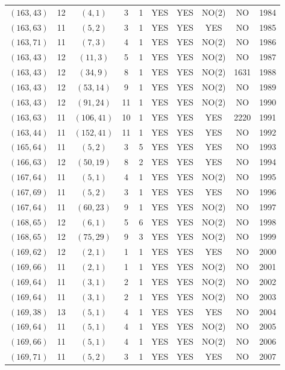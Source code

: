 \begin{longtable}{|c|c|c|c|c|c|c|c|c|c|}
$(163, 43)$ & 12 & $(4, 1)$ & 3 & 1 & YES & YES & NO(2) & NO & 1984\\
$(163, 63)$ & 11 & $(5, 2)$ & 3 & 1 & YES & YES & YES & NO & 1985\\
$(163, 71)$ & 11 & $(7, 3)$ & 4 & 1 & YES & YES & NO(2) & NO & 1986\\
$(163, 43)$ & 12 & $(11, 3)$ & 5 & 1 & YES & YES & NO(2) & NO & 1987\\
$(163, 43)$ & 12 & $(34, 9)$ & 8 & 1 & YES & YES & NO(2) & 1631 & 1988\\
$(163, 43)$ & 12 & $(53, 14)$ & 9 & 1 & YES & YES & NO(2) & NO & 1989\\
$(163, 43)$ & 12 & $(91, 24)$ & 11 & 1 & YES & YES & NO(2) & NO & 1990\\
$(163, 63)$ & 11 & $(106, 41)$ & 10 & 1 & YES & YES & YES & 2220 & 1991\\
$(163, 44)$ & 11 & $(152, 41)$ & 11 & 1 & YES & YES & YES & NO & 1992\\
$(165, 64)$ & 11 & $(5, 2)$ & 3 & 5 & YES & YES & YES & NO & 1993\\
$(166, 63)$ & 12 & $(50, 19)$ & 8 & 2 & YES & YES & YES & NO & 1994\\
$(167, 64)$ & 11 & $(5, 1)$ & 4 & 1 & YES & YES & NO(2) & NO & 1995\\
$(167, 69)$ & 11 & $(5, 2)$ & 3 & 1 & YES & YES & YES & NO & 1996\\
$(167, 64)$ & 11 & $(60, 23)$ & 9 & 1 & YES & YES & NO(2) & NO & 1997\\
$(168, 65)$ & 12 & $(6, 1)$ & 5 & 6 & YES & YES & NO(2) & NO & 1998\\
$(168, 65)$ & 12 & $(75, 29)$ & 9 & 3 & YES & YES & NO(2) & NO & 1999\\
$(169, 62)$ & 12 & $(2, 1)$ & 1 & 1 & YES & YES & YES & NO & 2000\\
$(169, 66)$ & 11 & $(2, 1)$ & 1 & 1 & YES & YES & NO(2) & NO & 2001\\
$(169, 64)$ & 11 & $(3, 1)$ & 2 & 1 & YES & YES & NO(2) & NO & 2002\\
$(169, 64)$ & 11 & $(3, 1)$ & 2 & 1 & YES & YES & NO(2) & NO & 2003\\
$(169, 38)$ & 13 & $(5, 1)$ & 4 & 1 & YES & YES & YES & NO & 2004\\
$(169, 64)$ & 11 & $(5, 1)$ & 4 & 1 & YES & YES & NO(2) & NO & 2005\\
$(169, 66)$ & 11 & $(5, 1)$ & 4 & 1 & YES & YES & NO(2) & NO & 2006\\
$(169, 71)$ & 11 & $(5, 2)$ & 3 & 1 & YES & YES & YES & NO & 2007\\

\end{longtable}
